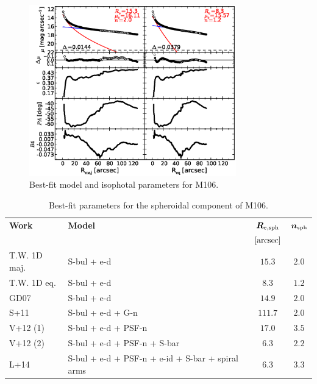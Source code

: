 \documentclass[preprint2]{emulateapj}
\newcommand{\fitfigurewidth}{0.8\textwidth}
\begin{document}
  \begin{figure}[h]
  \begin{center}
  \includegraphics[width=\fitfigurewidth]{images/m106_1Dfit.eps}
  \caption{Best-fit model and isophotal parameters for M106.}
  \end{center}
  \end{figure}

  \begin{table}[h]
  \small
  \caption{Best-fit parameters for the spheroidal component of M106.}
  \begin{center}
  \begin{tabular}{llcc}
  \hline
  {\bf Work} & {\bf Model}   & $\bm R_{\rm e,sph}$    & $\bm n_{\rm sph}$ \\
    &  &  $[\rm arcsec]$ & \\
  \hline
  T.W. 1D maj. & S-bul + e-d & $15.3$  &  $2.0$ \\
  T.W. 1D eq.  & S-bul + e-d & $8.3$   &  $1.2$ \\
  \hline
  GD07     & S-bul + e-d		 & $14.9$   &  $2.0$ \\
  S+11     & S-bul + e-d + G-n  	 & $111.7$  &  $2.0$ \\
  V+12 (1) & S-bul + e-d + PSF-n	 & $17.0$   &  $3.5$ \\
  V+12 (2) & S-bul + e-d + PSF-n + S-bar & $6.3$    &  $2.2$ \\
  L+14     & S-bul + e-d + PSF-n + e-id + S-bar + spiral arms & $6.3$	 &  $3.3$ \\
  \hline
  \end{tabular}
  \end{center}
  \label{tab:m106}
  \end{table}
\end{document}
